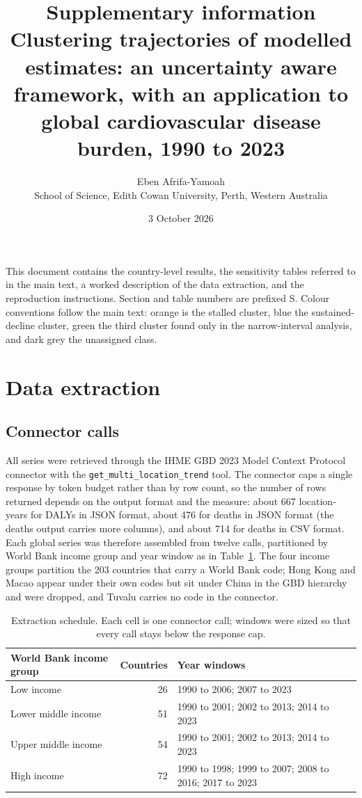 \documentclass[11pt,a4paper]{article}
\title{Supplementary information\\[4pt]\large Clustering trajectories of modelled estimates: an uncertainty aware framework, with an application to global cardiovascular disease burden, 1990 to 2023}
\author{Eben Afrifa-Yamoah\\ \small School of Science, Edith Cowan University, Perth, Western Australia}
\date{3 October 2026}
\begin{document}
\maketitle

\noindent This document contains the country-level results, the sensitivity tables referred to in the main text, a worked description of the data extraction, and the reproduction instructions. Section and table numbers are prefixed S. Colour conventions follow the main text: orange is the stalled cluster, blue the sustained-decline cluster, green the third cluster found only in the narrow-interval analysis, and dark grey the unassigned class.

\tableofcontents

\section{Data extraction}

\subsection{Connector calls}

All series were retrieved through the IHME GBD 2023 Model Context Protocol connector with the \texttt{get\_multi\_location\_trend} tool. The connector caps a single response by token budget rather than by row count, so the number of rows returned depends on the output format and the measure: about 667 location-years for DALYs in JSON format, about 476 for deaths in JSON format (the deaths output carries more columns), and about 714 for deaths in CSV format. Each global series was therefore assembled from twelve calls, partitioned by World Bank income group and year window as in Table~\ref{tab:calls}. The four income groups partition the 203 countries that carry a World Bank code; Hong Kong and Macao appear under their own codes but sit under China in the GBD hierarchy and were dropped, and Tuvalu carries no code in the connector.

\begin{table}[h]
\centering\small
\caption{Extraction schedule. Each cell is one connector call; windows were sized so that every call stays below the response cap.}
\label{tab:calls}
\begin{tabular}{lrl}
\toprule
World Bank income group & Countries & Year windows \\
\midrule
Low income & 26 & 1990 to 2006; 2007 to 2023 \\
Lower middle income & 51 & 1990 to 2001; 2002 to 2013; 2014 to 2023 \\
Upper middle income & 54 & 1990 to 2001; 2002 to 2013; 2014 to 2023 \\
High income & 72 & 1990 to 1998; 1999 to 2007; 2008 to 2016; 2017 to 2023 \\
\bottomrule
\end{tabular}
\end{table}
\end{document}
